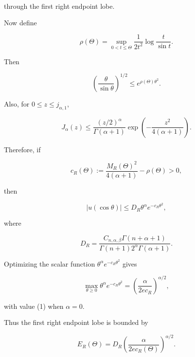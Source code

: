 \documentclass[11pt]{article}
\begin{document}
through the first right endpoint lobe.

Now define

\begin{equation*}
\rho(\Theta)
=
\sup_{0<t\le\Theta}
\frac{1}{2t^2}\log\frac{t}{\sin t}.
\end{equation*}


Then

\begin{equation*}
\left(\frac{\theta}{\sin\theta}\right)^{1/2}
\le
e^{\rho(\Theta)\theta^2}.
\end{equation*}


Also, for \(0\le z\le j_{\alpha,1}\),

\begin{equation*}
J_\alpha(z)
\le
\frac{(z/2)^\alpha}{\Gamma(\alpha+1)}
\exp\left(-\frac{z^2}{4(\alpha+1)}\right).
\end{equation*}


Therefore, if

\begin{equation*}
\boxed{
c_R(\Theta)
:=
\frac{M_R(\Theta)^2}{4(\alpha+1)}
-
\rho(\Theta)
> 0,
}
\tag{23}
\end{equation*}


then

\begin{equation*}
|u(\cos\theta)|
\le
D_R
\theta^\alpha e^{-c_R\theta^2},
\tag{24}
\end{equation*}


where

\begin{equation*}
\boxed{
D_R
=
\frac{
C_{n,\alpha,\beta}\Gamma(n+\alpha+1)
}
{
\Gamma(n+1)2^\alpha\Gamma(\alpha+1)
}.
}
\tag{25}
\end{equation*}


Optimizing the scalar function \(\theta^\alpha e^{-c_R\theta^2}\) gives

\begin{equation*}
\max_{\theta\ge0}\theta^\alpha e^{-c_R\theta^2}
=
\left(\frac{\alpha}{2e c_R}\right)^{\alpha/2},
\end{equation*}


with value (1) when \(\alpha=0\).

Thus the first right endpoint lobe is bounded by

\begin{equation*}
\boxed{
E_R(\Theta)
=
D_R
\left(\frac{\alpha}{2e c_R(\Theta)}\right)^{\alpha/2}.
}
\tag{26}
\end{equation*}
\end{document}
